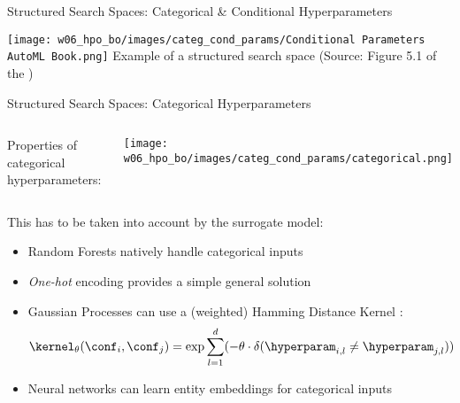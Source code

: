 \begin{frame}[c]{Structured Search Spaces: Categorical \&  Conditional Hyperparameters}
\begin{center}
    \texttt{[image: w06\_hpo\_bo/images/categ\_cond\_params/Conditional Parameters AutoML Book.png]}
    \newline
    Example of a structured search space (Source: Figure 5.1 of the )
\end{center}
\end{frame}
\begin{frame}[c]{Structured Search Spaces: Categorical Hyperparameters}

\begin{columns}[T]

\medskip
Properties of categorical hyperparameters:


\vspace{0.5cm}
\texttt{[image: w06\_hpo\_bo/images/categ\_cond\_params/categorical.png]}
%
\end{columns}

\pause
\vspace*{-0.4cm}
This has to be taken into account by the surrogate model:
%
\begin{itemize}
    \item Random Forests \alert{natively} handle categorical inputs 
    \item \emph{One-hot} encoding provides a simple general solution
    \item Gaussian Processes can use a (weighted) \alert{Hamming Distance Kernel} :
\vspace*{-0.2cm}
\begin{equation*}
    \kernel_{\theta}(\conf_i, \conf_j) = \exp{\sum_{l=1}^d (-\theta \cdot \delta(\hyperparam_{i,l} \neq \hyperparam_{j,l}))}
\end{equation*}

\vspace*{-0.2cm}
\item Neural networks can learn \alert{entity embeddings} for categorical inputs 
\end{itemize}
%
\end{frame}
